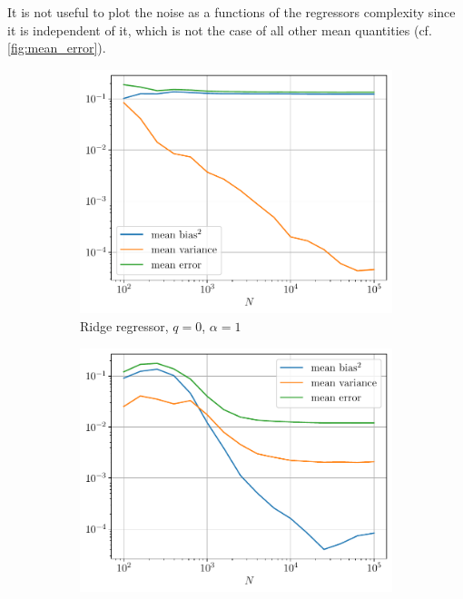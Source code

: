 \documentclass[a4paper, 12pt]{article}
\begin{document}
\begin{enumerate}[label=(\alph*)]
        It is not useful to plot the noise as a functions of the regressors complexity since it is independent of it, which is not the case of all other mean quantities (cf. \ref{fig:mean_error}).
        
        \begin{figure}[h]
            \centering
            \begin{subfigure}{0.48\textwidth}
                \includegraphics[width=\textwidth]{resources/pdf/rrg_mean_n.pdf}
                \caption{Ridge regressor, $q = 0$, $\alpha = 1$}
                \vspace{0.5em}
            \end{subfigure}
            \begin{subfigure}{0.48\textwidth}
                \includegraphics[width=\textwidth]{resources/pdf/knr_mean_n.pdf}

\end{subfigure}
\end{figure}
\end{enumerate}
\end{document}
